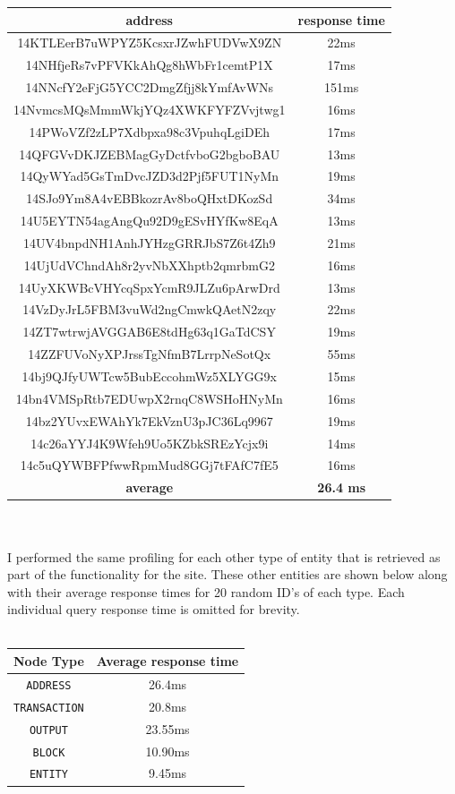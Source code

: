 \begin{center}
\begin{tabular}{ |c|c| } 
 \hline
\textbf{address} & \textbf{response time} \\\hline
14KTLEerB7uWPYZ5KcsxrJZwhFUDVwX9ZN & 22ms \\ 
14NHfjeRs7vPFVKkAhQg8hWbFr1cemtP1X & 17ms \\ 
14NNcfY2eFjG5YCC2DmgZfjj8kYmfAvWNs & 151ms \\ 
14NvmcsMQsMmmWkjYQz4XWKFYFZVvjtwg1 & 16ms \\ 
14PWoVZf2zLP7Xdbpxa98c3VpuhqLgiDEh & 17ms \\ 
14QFGVvDKJZEBMagGyDctfvboG2bgboBAU & 13ms \\ 
14QyWYad5GsTmDvcJZD3d2Pjf5FUT1NyMn & 19ms \\ 
14SJo9Ym8A4vEBBkozrAv8boQHxtDKozSd & 34ms \\ 
14U5EYTN54agAngQu92D9gESvHYfKw8EqA & 13ms \\ 
14UV4bnpdNH1AnhJYHzgGRRJbS7Z6t4Zh9 & 21ms \\ 
14UjUdVChndAh8r2yvNbXXhptb2qmrbmG2 & 16ms \\ 
14UyXKWBcVHYcqSpxYcmR9JLZu6pArwDrd & 13ms \\ 
14VzDyJrL5FBM3vuWd2ngCmwkQAetN2zqy & 22ms \\
14ZT7wtrwjAVGGAB6E8tdHg63q1GaTdCSY & 19ms \\
14ZZFUVoNyXPJrssTgNfmB7LrrpNeSotQx & 55ms \\
14bj9QJfyUWTcw5BubEccohmWz5XLYGG9x & 15ms \\ 
14bn4VMSpRtb7EDUwpX2rnqC8WSHoHNyMn & 16ms \\
14bz2YUvxEWAhYk7EkVznU3pJC36Lq9967 & 19ms \\
14c26aYYJ4K9Wfeh9Uo5KZbkSREzYcjx9i & 14ms \\
14c5uQYWBFPfwwRpmMud8GGj7tFAfC7fE5 & 16ms \\
\hline \textbf{average} & \textbf{26.4 ms} \\\hline
\end{tabular}
\end{center}
\\\\
I performed the same profiling for each other type of entity that is retrieved as part of the functionality for the site. These other entities are shown below along with their average response times for 20 random ID's of each type. Each individual query response time is omitted for brevity. 
\\\\
\begin{center}
\begin{tabular}{ |c|c| } 
 \hline
\textbf{Node Type} & \textbf{Average response time} \\\hline
\texttt{ADDRESS} & 26.4ms \\
\texttt{TRANSACTION} & 20.8ms \\
\texttt{OUTPUT} & 23.55ms \\
\texttt{BLOCK} & 10.90ms \\
\texttt{ENTITY} & 9.45ms \\
\hline
\end{tabular}
\end{center}
